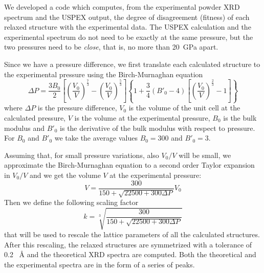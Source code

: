 \documentclass{article}
\begin{document}
We developed a code which computes, from the experimental powder XRD spectrum and the USPEX output, the degree of disagreement (fitness) of each relaxed structure with the experimental data. The USPEX calculation and the experimental spectrum do not need to be exactly at the same pressure, but the two pressures need to be \emph{close}, that is, no more than \SI{20}{GPa} apart.

Since we have a pressure difference, we first translate each calculated structure to the experimental pressure using the Birch-Murnaghan equation
\begin{equation*}
	\Delta P = \frac{3 B_0}{2} \left[ \left( \frac{V_0}{V} \right)^{\frac{7}{3}} - \left( \frac{V_0}{V} \right)^{\frac{5}{3}} \right] \left\{ 1 + \frac{3}{4} \left( B'_0 - 4 \right) \left[ \left( \frac{V_0}{V} \right)^{\frac{2}{3}} - 1 \right] \right\}
\end{equation*}
where $\Delta P$ is the pressure difference, $V_0$ is the volume of the unit cell at the calculated pressure, $V$ is the volume at the experimental pressure, $B_0$ is the bulk modulus and $B'_0$ is the derivative of the bulk modulus with respect to pressure. For $B_0$ and $B'_0$ we take the average values $B_0 = 300$ and $B'_0 = 3$. 

Assuming that, for small pressure variations, also $V_0/V$ will be small, we approximate the Birch-Murnaghan equation to a second order Taylor expansion in $V_0/V$ and we get the volume $V$ at the experimental pressure:
\begin{equation*}
	V = \frac{300}{150 + \sqrt{22500 + 300 \Delta P}} V_0
\end{equation*}
Then we define the following scaling factor
\begin{equation*}
	k = \sqrt[3]{\frac{300}{150 + \sqrt{22500 + 300 \Delta P}}}
\end{equation*}
that will be used to rescale the lattice parameters of all the calculated structures. After this rescaling, the relaxed structures are symmetrized with a tolerance of 0.2 \SI{}{\angstrom} and the theoretical XRD spectra are computed. Both the theoretical and the experimental spectra are in the form of a series of peaks.
\end{document}
